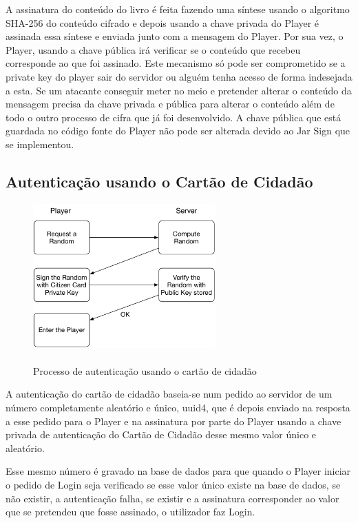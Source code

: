 \documentclass[pdftex,12pt,a4paper]{report}
\begin{document}
A assinatura do conteúdo do livro é feita fazendo uma síntese usando o algoritmo SHA-256 do conteúdo cifrado e depois usando a chave privada do Player é assinada essa síntese e enviada junto com a mensagem do Player. Por sua vez, o Player, usando a chave pública irá verificar se o conteúdo que recebeu corresponde ao que foi assinado.
Este mecanismo só pode ser comprometido se a private key do player sair do servidor ou alguém tenha acesso de forma indesejada a esta. Se um atacante conseguir meter no meio e pretender alterar o conteúdo da mensagem precisa da chave privada e pública para alterar o conteúdo além de todo o outro processo de cifra que já foi desenvolvido. 
A chave pública que está guardada no código fonte do Player não pode ser alterada devido ao Jar Sign que se implementou.

\newpage

\subsection{Autenticação usando o Cartão de Cidadão}

\begin{figure}[!htb]
\center
 \includegraphics[width=70mm,scale=1]{auth-sign.pdf}
 \caption{\\Processo de autenticação usando o cartão de cidadão}
 \label{fig:cc_process}
\end{figure}

A autenticação do cartão de cidadão baseia-se num pedido ao servidor de um número completamente aleatório e único, uuid4, que é depois enviado na resposta a esse pedido para o Player e na assinatura por parte do Player usando a chave privada de autenticação do Cartão de Cidadão desse mesmo valor único e aleatório. 

Esse mesmo número é gravado na base de dados para que  quando o Player iniciar o pedido de Login seja verificado se esse valor único existe na base de dados, se não existir, a autenticação falha, se existir e a assinatura corresponder ao valor que se pretendeu que fosse assinado, o utilizador faz Login.
\end{document}
